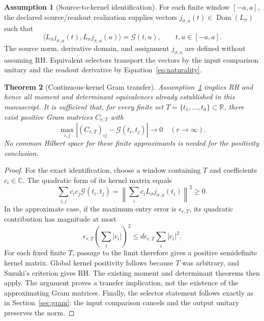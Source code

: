 \documentclass[11pt,letterpaper]{article}
\numberwithin{equation}{section}
\newtheorem{theorem}{Theorem}[section]
\theoremstyle{definition}
\newtheorem{assumption}[theorem]{Assumption}
\theoremstyle{remark}
\newcommand{\R}{\mathbb R}
\newcommand{\C}{\mathbb C}
\DeclareMathOperator{\Dom}{Dom}
\begin{document}
\begin{assumption}[Source-to-kernel identification]
\label{ass:source_screw}
For each finite window $[-a,a]$, the declared source/readout realization supplies vectors $j_{\sigma,a}(t)\in\Dom(L_\sigma)$ such that
\begin{equation}
 \langle L_\sigma j_{\sigma,a}(t),L_\sigma j_{\sigma,a}(u)\rangle
 =\mathscr G(t,u),\qquad t,u\in[-a,a].
 \label{eq:source_screw_gram}
\end{equation}
The source norm, derivative domain, and assignment $j_{\sigma,a}$ are defined without assuming RH. Equivalent selectors transport the vectors by the input comparison unitary and the readout derivative by Equation~\eqref{eq:naturality}.
\end{assumption}

\begin{theorem}[Continuous-kernel Gram transfer]
\label{thm:source_screw_transfer}
Assumption~\ref{ass:source_screw} implies RH and hence all moment and determinant equivalences already established in this manuscript. It is sufficient that, for every finite set $T=\{t_1,\ldots,t_d\}\subset\R$, there exist positive Gram matrices $C_{r,T}$ with
\begin{equation}
 \max_{i,j}|(C_{r,T})_{ij}-\mathscr G(t_i,t_j)|\longrightarrow0
 \quad(r\to\infty).
 \label{eq:screw_finite_transfer}
\end{equation}
No common Hilbert space for these finite approximants is needed for the positivity conclusion.
\end{theorem}
\begin{proof}
For the exact identification, choose a window containing $T$ and coefficients $c_i\in\C$. The quadratic form of its kernel matrix equals
\[
 \sum_{i,j}\overline{c_i}c_j\mathscr G(t_i,t_j)
 =\left\|\sum_i c_iL_\sigma j_{\sigma,a}(t_i)\right\|^2\geq0.
\]
In the approximate case, if the maximum entry error is $\epsilon_{r,T}$, its quadratic contribution has magnitude at most
\[
 \epsilon_{r,T}\left(\sum_i|c_i|\right)^2
 \leq d\epsilon_{r,T}\sum_i|c_i|^2.
\]
For each fixed finite $T$, passage to the limit therefore gives a positive semidefinite kernel matrix. Global kernel positivity follows because $T$ was arbitrary, and Suzuki's criterion gives RH. The existing moment and determinant theorems then apply. The argument proves a transfer implication, not the existence of the approximating Gram matrices. Finally, the selector statement follows exactly as in Section~\ref{sec:gram}: the input comparison cancels and the output unitary preserves the norm.
\end{proof}
\end{document}
